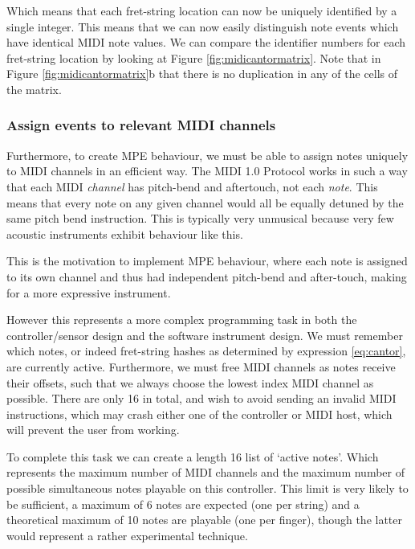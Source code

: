 Which means that each fret-string location can now be uniquely identified by a single integer. This means that we can now easily distinguish note events which have identical MIDI note values. We can compare the identifier numbers for each fret-string location by looking at Figure \ref{fig:midicantormatrix}. Note that in Figure \ref{fig:midicantormatrix}b that there is no duplication in any of the cells of the matrix. 

\subsubsection{Assign events to relevant MIDI channels}
Furthermore, to create MPE behaviour, we must be able to assign notes uniquely to MIDI channels in an efficient way. The MIDI 1.0 Protocol works in such a way that each MIDI \textit{channel} has pitch-bend and aftertouch, not each \textit{note}. This means that every note on any given channel would all be equally detuned by the same pitch bend instruction. This is typically very unmusical because very few acoustic instruments exhibit behaviour like this. 

This is the motivation to implement MPE behaviour, where each note is assigned to its own channel and thus had independent pitch-bend and after-touch, making for a more expressive instrument. 

However this represents a more complex programming task in both the controller/sensor design and the software instrument design. 
We must remember which notes, or indeed fret-string hashes as determined by expression \ref{eq:cantor}, are currently active. Furthermore, we must free MIDI channels as notes receive their offsets, such that we always choose the lowest index MIDI channel as possible. There are only 16 in total, and wish to avoid sending an invalid MIDI instructions, which may crash either one of the controller or MIDI host, which will prevent the user from working.

To complete this task we can create a length 16 list of `active notes'. Which represents the maximum number of MIDI channels and the maximum number of possible simultaneous notes playable on this controller. This limit is very likely to be sufficient, a maximum of 6 notes are expected (one per string) and a theoretical maximum of 10 notes are playable (one per finger), though the latter would represent a rather experimental technique. 

